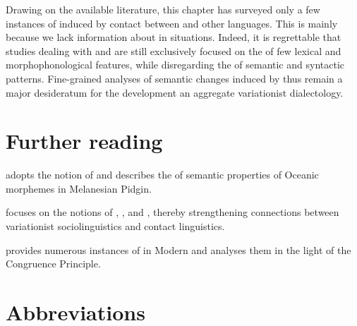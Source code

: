 \documentclass[output=paper]{langsci/langscibook}
\begin{document}
Drawing on the available literature, this chapter has surveyed only a few instances of   induced by contact between  and other languages. This is mainly because we lack information about  in  situations. Indeed, it is regrettable that studies dealing with  and   are still exclusively focused on the  of few lexical and morphophonological features, while disregarding the  of semantic and syntactic patterns. Fine-grained analyses of semantic changes induced by  thus remain a major desideratum for the development an aggregate variationist  dialectology.  

\section*{Further reading}
\begin{furtherreading}
\item[\citet{Keesing1988}] adopts the notion of  and describes the  of semantic properties of Oceanic morphemes in Melanesian Pidgin.
\item[\citet{Meyerhoff2009}] focuses on the notions of , , and , thereby strengthening connections between variationist sociolinguistics and contact linguistics.
\item[\citet{Zuckermann2009}] provides numerous instances of  in Modern  and analyses them in the light of the Congruence Principle.
\end{furtherreading}

\section*{Abbreviations}
\end{document}
